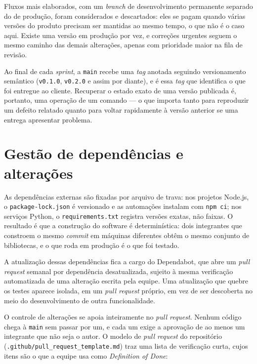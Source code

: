 \documentclass[a4paper,12pt,oneside,openany]{book}
\newif\iforientacoes
\newcommand{\orientacao}[1]{%
    \iforientacoes
        \begin{quote}
        \small\itshape\textbf{Orientação:} #1
        \end{quote}
    \fi
}
\begin{document}
Fluxos mais elaborados, com um \textit{branch} de desenvolvimento permanente
separado do de produção, foram considerados e descartados: eles se pagam quando
várias versões do produto precisam ser mantidas ao mesmo tempo, o que não é o
caso aqui. Existe uma versão em produção por vez, e correções urgentes seguem o
mesmo caminho das demais alterações, apenas com prioridade maior na fila de
revisão.

Ao final de cada \textit{sprint}, a \texttt{main} recebe uma \textit{tag}
anotada seguindo versionamento semântico (\texttt{v0.1.0}, \texttt{v0.2.0} e
assim por diante), e é essa \textit{tag} que identifica o que foi entregue ao
cliente. Recuperar o estado exato de uma versão publicada é, portanto, uma
operação de um comando --- o que importa tanto para reproduzir um defeito
relatado quanto para voltar rapidamente à versão anterior se uma entrega
apresentar problema.

\section{Gestão de dependências e alterações}

\orientacao{Expliquem como dependências externas são registradas e versionadas
e como alterações relevantes são controladas. Quando uma alteração afetar
vários artefatos, indiquem como a equipe mantém a coerência entre código,
testes, documentação e demais elementos relacionados.}

As dependências externas são fixadas por arquivo de trava: nos projetos
Node.js, o \texttt{package-lock.json} é versionado e as automações instalam com
\texttt{npm ci}; nos serviços Python, o \texttt{requirements.txt} registra
versões exatas, não faixas. O resultado é que a construção do software é
determinística: dois integrantes que constroem o mesmo \textit{commit} em
máquinas diferentes obtêm o mesmo conjunto de bibliotecas, e o que roda em
produção é o que foi testado.

A atualização dessas dependências fica a cargo do Dependabot, que abre um
\textit{pull request} semanal por dependência desatualizada, sujeito à mesma
verificação automatizada de uma alteração escrita pela equipe. Uma atualização
que quebre os testes aparece isolada, em um \textit{pull request} próprio, em
vez de ser descoberta no meio do desenvolvimento de outra funcionalidade.

O controle de alterações se apoia inteiramente no \textit{pull request}. Nenhum
código chega à \texttt{main} sem passar por um, e cada um exige a aprovação de
ao menos um integrante que não seja o autor. O modelo de \textit{pull request}
do repositório (\texttt{.github/pull\_request\_template.md}) traz uma lista de
verificação curta, cujos itens são o que a equipe usa como \textit{Definition
of Done}:
\end{document}
